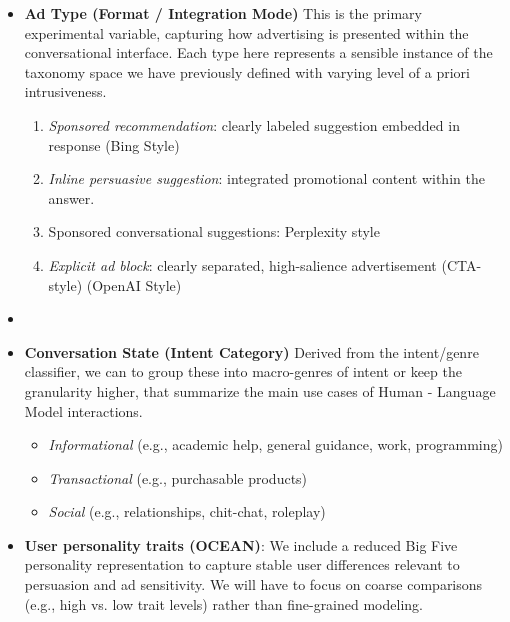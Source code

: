 \documentclass{article}
\begin{document}
\begin{itemize}

    \item \textbf{Ad Type (Format / Integration Mode)}  
    This is the primary experimental variable, capturing how advertising is presented within the conversational interface. Each type here represents a sensible instance of the taxonomy space we have previously defined with varying level of a priori intrusiveness.
    
    \begin{enumerate}
        \item \textit{Sponsored recommendation}: clearly labeled suggestion embedded in response (Bing Style)
        \item \textit{Inline persuasive suggestion}: integrated promotional content within the answer.
        \item Sponsored conversational suggestions: Perplexity style
        \item \textit{Explicit ad block}: clearly separated, high-salience advertisement (CTA-style) (OpenAI Style)
    \end{enumerate}

    \item 

    \item \textbf{Conversation State (Intent Category)}  
    Derived from the intent/genre classifier, we can to group these into macro-genres of intent or keep the granularity higher, that summarize the main use cases of Human - Language Model interactions.
    \begin{itemize}
        \item \textit{Informational} (e.g., academic help, general guidance, work, programming)
        \item \textit{Transactional} (e.g., purchasable products)
        \item \textit{Social} (e.g., relationships, chit-chat, roleplay)
    \end{itemize}

    \item \textbf{User personality traits (OCEAN)}:     We include a reduced Big Five personality representation to capture stable user differences relevant to persuasion and ad sensitivity. We will have to focus on coarse comparisons (e.g., high vs. low trait levels) rather than fine-grained modeling.


    
\end{itemize}
\end{document}
